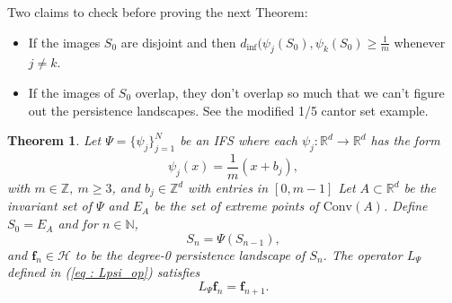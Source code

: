 \documentclass [52pt] {article}
\newcommand{\R}{\mathbb{R}}
\newcommand{\Z}{\mathbb{Z}}
\newcommand{\N}{\mathbb{N}}
\newcommand{\Hil}{\mathcal{H}}
\newcommand{\conv}{\text{Conv}}
\newtheorem{theorem}{Theorem}
\begin{document}
Two claims to check before proving the next Theorem:
\begin{itemize}
\item If the images $S_0$ are disjoint and then $d_{\inf}(\psi_j(S_0), \psi_k(S_0)\ge \frac{1}{m}$ whenever $j\not=k$.
\item If the images of $S_0$ overlap, they don't overlap so much that we can't figure out the persistence landscapes.  See the modified 1/5 cantor set example. 
\end{itemize}


\begin{theorem}
Let $\Psi = \{\psi_{j}\}_{j=1}^N$ be an IFS where each $\psi_j:\R^d\to\R^d$ has the form
\[\psi_j(x) = \frac{1}{m}(x +b_j),\]
with $m\in\Z,\:m\ge 3$, and $b_j\in \Z^d$ with entries in $[0,m-1]$  
  Let $A\subset\R^d$ be the invariant set of $\Psi$ and $E_A$ be the set of extreme points of $\conv(A)$.  Define $S_0 = E_A$ and for $n\in\N$, 
\[S_n = \Psi(S_{n-1}),\]
and $\mathbf{f}_n\in\Hil$ to be the degree-0 persistence landscape of $S_n$.  The operator $L_\Psi$ defined in (\ref{eq : Lpsi_op}) satisfies
\[L_\Psi\mathbf{f}_n = \mathbf{f}_{n+1}.\]
\end{theorem}
\end{document}
